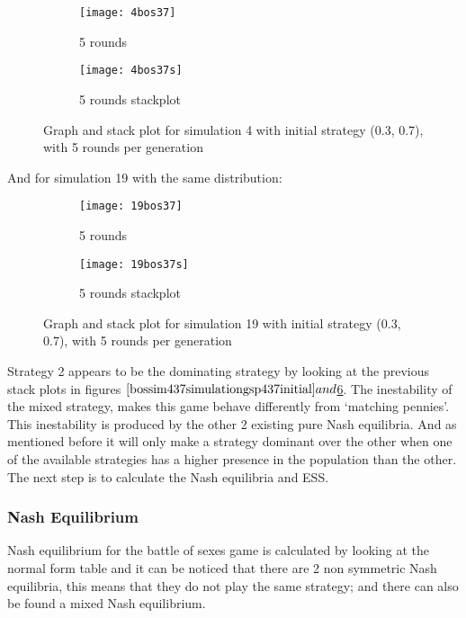 \begin{figure}[H]       
    \centering
    \begin{subfigure}[b]{0.3\textwidth}
	\centering
	{\texttt{[image: 4bos37]}}   
    	\caption{5 rounds}
	\label{fig:bossim437}
    \end{subfigure}
    \hfill
    \begin{subfigure}[b]{0.3\textwidth}
	\centering
	{\texttt{[image: 4bos37s]}}   
    	\caption{5 rounds stackplot}
	\label{fig:bossim437s}
    \end{subfigure}
    \caption{Graph and stack plot for simulation 4 with initial strategy (0.3, 0.7), with 5 rounds per generation}
    \label{bossim437simulationgsp437initial}
\end{figure}

And for simulation 19 with the same distribution:
\begin{figure}[H]       
    \centering
    \begin{subfigure}[b]{0.3\textwidth}
	\centering
	{\texttt{[image: 19bos37]}}   
    	\caption{5 rounds}
	\label{fig:bossim1937}
    \end{subfigure}
    \hfill
    \begin{subfigure}[b]{0.3\textwidth}
	\centering
	{\texttt{[image: 19bos37s]}}   
    	\caption{5 rounds stackplot}
	\label{fig:bossim1937s}
    \end{subfigure}
    \caption{Graph and stack plot for simulation 19 with initial strategy (0.3, 0.7), with 5 rounds per generation}
    \label{bossim1937simulationgsp1937initial}
\end{figure}
Strategy 2 appears to be the dominating strategy by looking at the previous stack plots in figures $\ref{bossim437simulationgsp437initial} and $\ref{bossim1937simulationgsp1937initial}. The inestability of the mixed strategy, makes this game behave differently from `matching pennies'. This inestability is produced by the other 2 existing pure Nash equilibria. And as mentioned before it will only make a strategy dominant over the other when one of the available strategies has a higher presence in the population than the other. The next step is to calculate the Nash equilibria and ESS.


\subsubsection{Nash Equilibrium}
 Nash equilibrium for the battle of sexes game is calculated by looking at the normal form table and it can be noticed that there are 2 non symmetric Nash equilibria, this means that they do not play the same strategy; and there can also be found a mixed Nash equilibrium.

